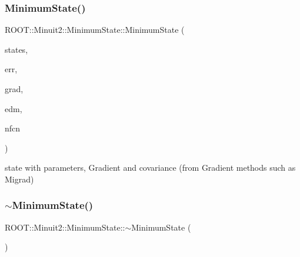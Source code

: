 \subsubsection{\texorpdfstring{MinimumState()}{MinimumState()}\hspace{0.1cm}{\footnotesize\ttfamily [7/12]}}
{\footnotesize\ttfamily R\+O\+O\+T\+::\+Minuit2\+::\+Minimum\+State\+::\+Minimum\+State (\begin{DoxyParamCaption}\item[{const \mbox{\hyperlink{classROOT_1_1Minuit2_1_1MinimumParameters}{Minimum\+Parameters}} \&}]{states,  }\item[{const \mbox{\hyperlink{classROOT_1_1Minuit2_1_1MinimumError}{Minimum\+Error}} \&}]{err,  }\item[{const \mbox{\hyperlink{classROOT_1_1Minuit2_1_1FunctionGradient}{Function\+Gradient}} \&}]{grad,  }\item[{double}]{edm,  }\item[{int}]{nfcn }\end{DoxyParamCaption})\hspace{0.3cm}{\ttfamily [inline]}}

state with parameters, Gradient and covariance (from Gradient methods such as Migrad) \mbox{\label{classROOT_1_1Minuit2_1_1MinimumState_a30666c7113d7e8c199d4de1b1a44ee03}} 
\subsubsection{\texorpdfstring{$\sim$MinimumState()}{~MinimumState()}\hspace{0.1cm}{\footnotesize\ttfamily [2/3]}}
{\footnotesize\ttfamily R\+O\+O\+T\+::\+Minuit2\+::\+Minimum\+State\+::$\sim$\+Minimum\+State (\begin{DoxyParamCaption}{ }\end{DoxyParamCaption})\hspace{0.3cm}{\ttfamily [inline]}}

\mbox{\label{classROOT_1_1Minuit2_1_1MinimumState_a7e5a25f631c74fffd8cfd14d2268600e}} 
